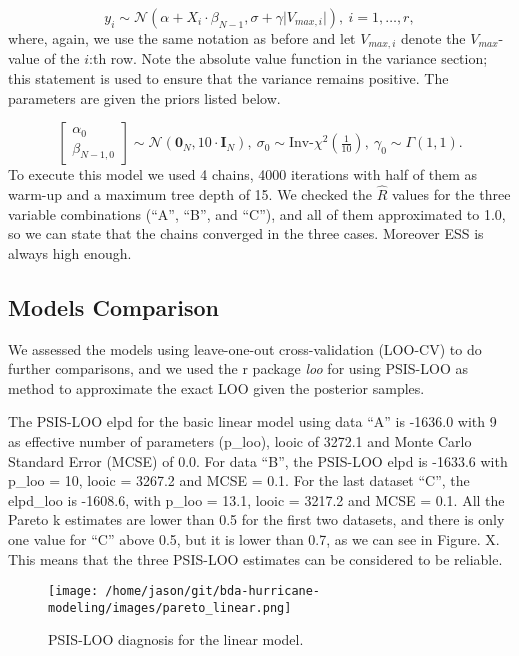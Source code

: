 \documentclass[
]{article}
\begin{document}
\[ y_{i} \sim \mathcal{N}(\alpha + X_i \cdot\beta_{N-1}, \sigma + \gamma\vert V_{max,i} \vert ), \ i=1,\dots,r, \]
where, again, we use the same notation as before and let \(V_{max,i}\)
denote the \(V_{max}\)-value of the \(i\):th row. Note the absolute
value function in the variance section; this statement is used to ensure
that the variance remains positive. The parameters are given the priors
listed below.

\[\begin{bmatrix} \alpha_0 \\ \beta_{N-1,0} \end{bmatrix} \sim \mathcal{N}(\mathbf{0}_N, 10 \cdot \mathbf{I}_N), \ \sigma_0 \sim \textrm{Inv-}\chi^2(\tfrac{1}{10}), \ \gamma_0 \sim \Gamma(1,1) .\]
To execute this model we used 4 chains, 4000 iterations with half of
them as warm-up and a maximum tree depth of 15. We checked the
\(\hat{R}\) values for the three variable combinations (``A'', ``B'',
and ``C''), and all of them approximated to 1.0, so we can state that
the chains converged in the three cases. Moreover ESS is always high
enough.

\hypertarget{models-comparison}{%
\subsection{Models Comparison}\label{models-comparison}}

We assessed the models using leave-one-out cross-validation (LOO-CV) to
do further comparisons, and we used the r package \emph{loo} for using
PSIS-LOO as method to approximate the exact LOO given the posterior
samples.

The PSIS-LOO elpd for the basic linear model using data ``A'' is -1636.0
with 9 as effective number of parameters (p\_loo), looic of 3272.1 and
Monte Carlo Standard Error (MCSE) of 0.0. For data ``B'', the PSIS-LOO
elpd is -1633.6 with p\_loo = 10, looic = 3267.2 and MCSE = 0.1. For the
last dataset ``C'', the elpd\_loo is -1608.6, with p\_loo = 13.1, looic
= 3217.2 and MCSE = 0.1. All the Pareto k estimates are lower than 0.5
for the first two datasets, and there is only one value for ``C'' above
0.5, but it is lower than 0.7, as we can see in Figure. X. This means
that the three PSIS-LOO estimates can be considered to be reliable.

\begin{figure}
\centering
\texttt{[image: /home/jason/git/bda-hurricane-modeling/images/pareto\_linear.png]}
\caption{PSIS-LOO diagnosis for the linear model.}
\end{figure}
\end{document}
